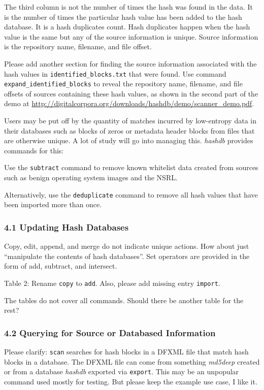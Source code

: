 \documentclass[12pt,twoside]{article}
\newcommand{\hdb}{\emph{hashdb}\xspace}
\newcommand{\mdd}{\emph{md5deep}\xspace}
\begin{document}
The third column is not the number of times the hash was found in the data.
It is the number of times the particular hash value has been added to the
hash database.
It is a hash duplicates count.
Hash duplicates happen when the hash value is the same
but any of the source information is unique.
Source information is the repository name, filename, and file offset.

Please add another section for finding the source information
associated with the hash values in \texttt{identified\_blocks.txt}
that were found.
Use command \texttt{expand\_identified\_blocks}
to reveal the repository name, filename, and file offsets of sources
containing these hash values, as shown in the second part of the demo at
\url{http://digitalcorpora.org/downloads/hashdb/demo/scanner\_demo.pdf}.

Users may be put off by the quantity of matches incurred
by low-entropy data in their databases
such as blocks of zeros or metadata header blocks from files
that are otherwise unique.
A lot of study will go into managing this.
\hdb provides commands for this:
\begin{compactitem}
\item Use the \texttt{subtract} command to remove known whitelist data
created from sources such as benign operating system images and the NSRL.
\item Alternatively, use the \texttt{deduplicate} command
to remove all hash values that have been imported more than once.
\end{compactitem}

\subsubsection*{4.1 Updating Hash Databases}
Copy, edit, append, and merge do not indicate unique actions.
How about just ``manipulate the contents of hash databases''.
Set operators are provided in the form of add, subtract, and intersect.

Table 2: Rename \texttt{copy} to \texttt{add}.
Also, please add missing entry \texttt{import}.

The tables do not cover all commands.
Should there be another table for the rest?

\subsubsection*{4.2 Querying for Source or Databased Information}
Please clarify: \texttt{scan} searches for hash blocks in a DFXML file
that match hash blocks in a database.
The DFXML file can come from something \mdd created or from a database
\hdb exported via \texttt{export}.
This may be an unpopular command used mostly for testing.
But please keep the example use case, I like it.
\end{document}
